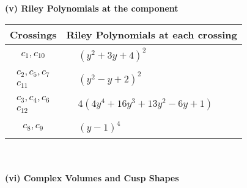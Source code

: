 \documentclass[1p]{elsarticle_modified}
\theoremstyle{definition}
\begin{document}
\newpage\renewcommand{\arraystretch}{1}
\flushleft \textbf{(v) Riley Polynomials at the component}\newline \\
\begin{tabular}{m{50pt}|m{274pt}}
Crossings & \hspace{64pt}Riley Polynomials at each crossing \\
\hline $$\begin{aligned}c_{1},c_{10}\end{aligned}$$&$\begin{aligned}
&(y^2+3 y+4)^2
\end{aligned}$\\
\hline $$\begin{aligned}c_{2},c_{5},c_{7}\\c_{11}\end{aligned}$$&$\begin{aligned}
&(y^2- y+2)^2
\end{aligned}$\\
\hline $$\begin{aligned}c_{3},c_{4},c_{6}\\c_{12}\end{aligned}$$&$\begin{aligned}
&4(4 y^4+16 y^3+13 y^2-6 y+1)
\end{aligned}$\\
\hline $$\begin{aligned}c_{8},c_{9}\end{aligned}$$&$\begin{aligned}
&(y-1)^4
\end{aligned}$\\
\hline
\end{tabular}\\~\\
\newpage\flushleft \textbf{(vi) Complex Volumes and Cusp Shapes}
\end{document}

